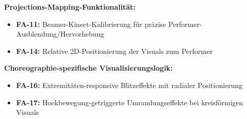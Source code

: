 \textbf{Projections-Mapping-Funktionalität:}
\begin{itemize}
    \item \textbf{FA-11:} Beamer-Kinect-Kalibrierung für präzise Performer-Ausblendung/Hervorhebung
    \item \textbf{FA-14:} Relative 2D-Positionierung der Visuals zum Performer
\end{itemize}

\textbf{Choreographie-spezifische Visualisierungslogik:}
\begin{itemize}
    \item \textbf{FA-16:} Extremitäten-responsive Blitzeffekte mit radialer Positionierung
    \item \textbf{FA-17:} Hockbewegung-getriggerte Umrandungseffekte bei kreisförmigen Visuals
\end{itemize}